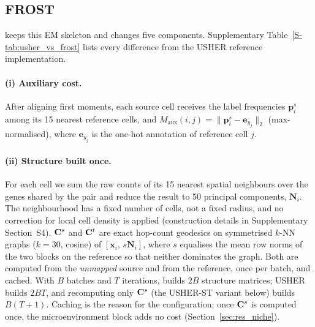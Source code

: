\subsection{FROST}\label{sec:frost}
\frost keeps this EM skeleton and changes five components. Supplementary Table~\ref{S-tab:usher_vs_frost} lists every
difference from the USHER reference implementation.

\paragraph{(i) Auxiliary cost.} After aligning first moments, each source cell receives the label frequencies
$\mathbf{p}^{s}_{i}$ among its 15 nearest reference cells, and
$M_{\mathrm{aux}}(i,j)=\|\mathbf{p}^{s}_{i}-\mathbf{e}_{y_j}\|_{2}$ (max-normalised), where $\mathbf{e}_{y_j}$ is
the one-hot annotation of reference cell $j$.

\paragraph{(ii) Structure built once.} For each cell we sum the raw counts of its 15 nearest spatial neighbours over
the genes shared by the pair and reduce the result to 50 principal components, $\mathbf{N}_i$. The neighbourhood has a
fixed number of cells, not a fixed radius, and no correction for local cell density is applied (construction details
in Supplementary Section~S4). $\mathbf{C}^{s}$ and $\mathbf{C}^{t}$ are exact hop-count geodesics on symmetrised $k$-NN graphs ($k=30$,
cosine) of $[\mathbf{x}_i,\,s\mathbf{N}_i]$, where $s$ equalises the mean row norms of the two blocks on the
reference so that neither dominates the graph. Both are computed from the \emph{unmapped} source and from the reference, once per batch, and cached. With $B$
batches and $T$ iterations, \frost builds $2B$ structure matrices; USHER builds $2BT$, and recomputing only $\mathbf{C}^{s}$
(the USHER-ST variant below) builds $B(T+1)$. Caching is the reason for the configuration; once $\mathbf{C}^{s}$ is computed
once, the microenvironment block adds no cost (Section~\ref{sec:res_niche}).

